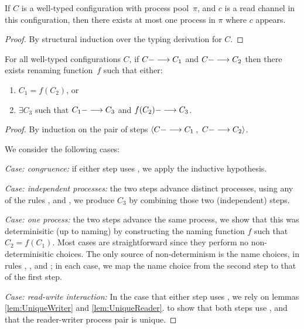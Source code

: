\begin{lemma}
\label{lem:UniqueReader}
If $C$ is a well-typed configuration with process pool~$\pi$, 
and $c$ is a read channel in this configuration,
then there exists at most one process in $\pi$ where $c$ appears.
\begin{proof}
By structural induction over the typing derivation for $C$.
\end{proof}
\end{lemma}

\begin{theorem}
For all well-typed configurations $C$,
%
 if $C ---> C_1$ 
and $C ---> C_2$ 
then 
there exists renaming function~$f$ 
such that either:
\begin{enumerate}
\item %
$C_1 = f(C_2)$,
or
\item $\exists C_3$ such that $C_1 ---> C_3$ and $f(C_2) ---> C_3$.
\end{enumerate}
\begin{proof}
   By induction on the pair of steps 
   $\left< C ---> C_1\right.$, 
   $\left.C ---> C_2 \right>$.

   We consider the following cases:

   \emph{Case: congruence:} if either step uses , we apply the inductive hypothesis.
   
   \emph{Case: independent processes:} 
     the two steps advance distinct processes, using any of the rules ,  and ,
     we produce $C_3$ by combining those two (independent) steps.     

   \emph{Case: one process:}    
   the two steps advance the same process, we show that this was
   determinisitic (up to naming) by constructing the naming function
   $f$ such that $C_2 = f(C_1)$.  Most cases are straightforward since
   they perform no non-determinisitic choices.  The only source of
   non-determinism is the name choices, in rules ,
   , and ; in each case, we map the name choice
   from the second step to that of the first step.

   \emph{Case: read-write interaction:}
   In the case that either step uses , 
   we rely on
   lemmas \ref{lem:UniqueWriter} and \ref{lem:UniqueReader}.
   to show that both steps use ,
   and that the reader-writer process pair is unique.
   
\end{proof}
\end{theorem}

